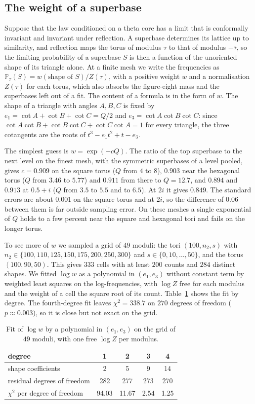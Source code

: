 \documentclass[11pt]{amsart}
\theoremstyle{definition}
\theoremstyle{remark}
\newcommand{\Prob}{\mathbb{P}}
\begin{document}
\subsection*{The weight of a superbase}
Suppose that the law conditioned on a theta core has a limit that is conformally invariant and invariant under
reflection. A superbase determines its lattice up to similarity, and reflection maps the torus of modulus $\tau$ to
that of modulus $-\bar\tau$, so the limiting probability of a superbase $S$ is then a function of the unoriented shape
of its triangle alone. At a finite mesh we write the frequencies as $\Prob_\tau(S)=w(\text{shape of }S)/Z(\tau)$, with
a positive weight $w$ and a normalisation $Z(\tau)$ for each torus, which also absorbs the figure-eight mass and the
superbases left out of a fit. The content of a formula is in the form of $w$. The shape of a triangle with angles
$A,B,C$ is fixed by $e_1=\cot A+\cot B+\cot C=Q/2$ and $e_3=\cot A\cot B\cot C$: since $\cot A\cot B+\cot B\cot
C+\cot C\cot A=1$ for every triangle, the three cotangents are the roots of $t^3-e_1t^2+t-e_3$.

The simplest guess is $w=\exp(-cQ)$. The ratio of the top superbase to the next level on the finest mesh, with the
symmetric superbases of a level pooled, gives $c=0.909$ on the square torus ($Q$ from $4$ to $8$), $0.903$ near the
hexagonal torus ($Q$ from $3.46$ to $5.77$) and $0.911$ from there to $Q=12.7$, and $0.894$ and $0.913$ at $0.5+i$
($Q$ from $3.5$ to $5.5$ and to $6.5$). At $2i$ it gives $0.849$. The standard errors are about $0.001$ on the square
torus and at $2i$, so the difference of $0.06$ between them is far outside sampling error. On these meshes a single
exponential of $Q$ holds to a few percent near the square and hexagonal tori and fails on the longer torus.

To see more of $w$ we sampled a grid of $49$ moduli: the tori $(100,n_2,s)$ with
$n_2\in\{100,110,125,150,175,200,250,300\}$ and $s\in\{0,10,\dots,50\}$, and the torus $(100,90,50)$. This gives $333$
cells with at least $200$ counts and $284$ distinct shapes. We fitted $\log w$ as a polynomial in $(e_1,e_3)$ without
constant term by weighted least squares on the log-frequencies, with $\log Z$ free for each modulus and the weight of a
cell the square root of its count. Table~\ref{tab:fit} shows the fit by degree. The fourth-degree fit leaves
$\chi^2=338.7$ on $270$ degrees of freedom ($p\approx0.003$), so it is close but not exact on the grid.

\begin{table}[tbp]
\centering
\small
\begin{tabular}{lcccc}
\toprule
degree & 1 & 2 & 3 & 4\\\midrule
shape coefficients & 2 & 5 & 9 & 14\\
residual degrees of freedom & 282 & 277 & 273 & 270\\
$\chi^2$ per degree of freedom & 94.03 & 11.67 & 2.54 & 1.25\\\bottomrule
\end{tabular}
\medskip
\caption{Fit of $\log w$ by a polynomial in $(e_1,e_3)$ on the grid of $49$ moduli, with one free $\log Z$ per
modulus.}
\label{tab:fit}
\end{table}
\end{document}
